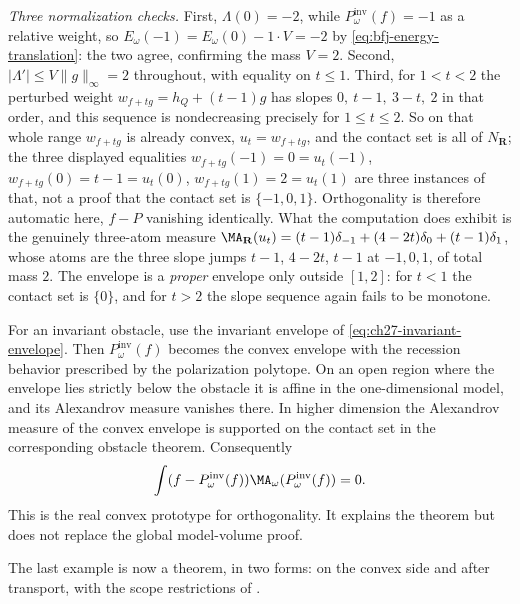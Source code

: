 \begin{example}
\emph{Three normalization checks.}  First, $\Lambda(0)=-2$, while
$P^{\mathrm{inv}}_\omega(f)=-1$ as a relative weight, so
$E_\omega(-1)=E_\omega(0)-1\cdot V=-2$ by
\eqref{eq:bfj-energy-translation}: the two agree, confirming the mass
$V=2$.  Second, $|\Lambda'|\leq V\lVert g\rVert_\infty=2$ throughout,
with equality on $t\leq1$.  Third, for $1<t<2$ the perturbed weight $w_{f+tg}=h_Q+(t-1)g$ has
slopes $0,\ t-1,\ 3-t,\ 2$ in that order, and this sequence is
nondecreasing precisely for $1\leq t\leq2$.  So on that whole range
$w_{f+tg}$ is already convex, $u_t=w_{f+tg}$, and the contact set is all
of $N_{\mathbf R}$; the three displayed equalities
$w_{f+tg}(-1)=0=u_t(-1)$, $w_{f+tg}(0)=t-1=u_t(0)$,
$w_{f+tg}(1)=2=u_t(1)$ are three instances of that, not a proof that the
contact set is $\{-1,0,1\}$.  Orthogonality is therefore automatic here,
$f-P$ vanishing identically.  What the computation does exhibit is the
genuinely three-atom measure
$\MA_{\mathbf R}(u_t)=(t-1)\delta_{-1}+(4-2t)\delta_0+(t-1)\delta_1$, whose
atoms are the three slope jumps $t-1$, $4-2t$, $t-1$ at $-1,0,1$, of
total mass $2$.  The envelope is a \emph{proper} envelope only outside
$[1,2]$: for $t<1$ the contact set is $\{0\}$, and for $t>2$ the
slope sequence again fails to be monotone.
\end{example}

\begin{example}
\label{ex:ch27-toric-contact-prototype}
For an invariant obstacle, use the invariant envelope of \eqref{eq:ch27-invariant-envelope}.  Then $P^{\mathrm{inv}}_\omega(f)$ becomes the convex envelope with
the recession behavior prescribed by the polarization polytope. On an open
region where the envelope lies strictly below the obstacle it is affine in
the one-dimensional model, and its Alexandrov measure vanishes there. In
higher dimension the Alexandrov measure of the convex envelope is supported
on the contact set in the corresponding obstacle theorem. Consequently
\[
       \int(f-P^{\mathrm{inv}}_\omega(f))\MA_\omega(P^{\mathrm{inv}}_\omega(f))=0.
\]
This is the real convex prototype for orthogonality. It explains the theorem
but does not replace the global model-volume proof.
\end{example}

The last example is now a theorem, in two forms:
 on the convex side and
 after transport, with the scope
restrictions of .

